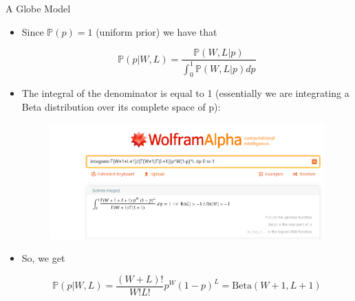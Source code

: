 \documentclass[handout]{beamer}
\begin{document}
\begin{frame}{A Globe Model}
\scriptsize{

\begin{itemize}


\item Since $\mathbb{P}(p)=1$ (uniform prior) we have that

\begin{displaymath}
\mathbb{P}(p|W,L) = \frac{\mathbb{P}(W,L|p)}{\int_0^1\mathbb{P}(W,L|p)dp} 
\end{displaymath}

\item The integral of the denominator is equal to 1 (essentially we are integrating a Beta distribution over its complete space of p):

\begin{figure}[h!]
	\centering
	\includegraphics[scale=0.25]{pics/wolphram.png}
\end{figure}

\item So, we get 

\begin{displaymath}
\mathbb{P}(p|W,L) =  \frac{(W+L)!}{W!L!}p^W(1-p)^L = \text{Beta}(W+1 , L+1) 
\end{displaymath}


\end{itemize}

} 

\end{frame}
\end{document}
